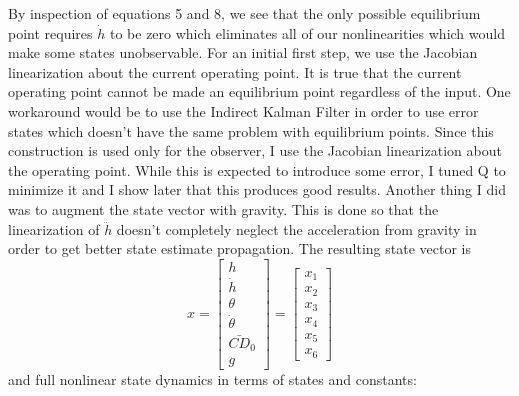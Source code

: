 \documentclass{article}
\begin{document}
  By inspection of equations 5 and 8, we see that the only possible equilibrium point requires $\dot{h}$ to be zero which eliminates all of our nonlinearities which would make some states unobservable. For an initial first step, we use the Jacobian linearization about the current operating point. It is true that the current operating point cannot be made an equilibrium point regardless of the input. One workaround would be to use the Indirect Kalman Filter in order to use error states which doesn't have the same problem with equilibrium points. Since this construction is used only for the observer, I use the Jacobian linearization about the operating point. While this is expected to introduce some error, I tuned Q to minimize it and I show later that this produces good results. Another thing I did was to augment the state vector with gravity. This is done so that the linearization of $\ddot{h}$ doesn't completely neglect the acceleration from gravity in order to get better state estimate propagation. The resulting state vector is
  \begin{equation}
    x = \left[\begin{matrix} h \\
                             \dot{h} \\
                             \theta \\
                             \dot{\theta} \\
                             \bar{CD}_0 \\
                             g          \end{matrix}\right]
      = \left[\begin{matrix} x_1 \\
                             x_2 \\
                             x_3 \\
                             x_4 \\
                             x_5 \\
                             x_6        \end{matrix}\right]
  \end{equation}
  and full nonlinear state dynamics in terms of states and constants:
\end{document}
